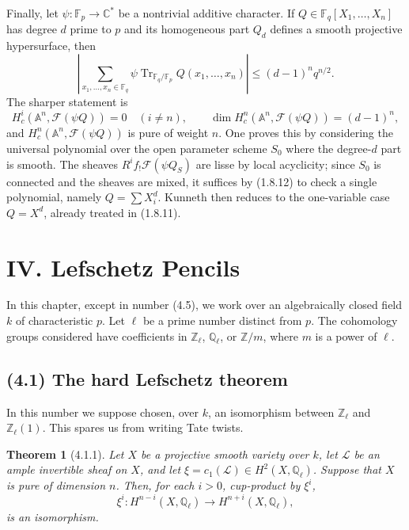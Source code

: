 \documentclass[11pt]{article}
\newtheorem{theorem}{Theorem}
\theoremstyle{remark}
\newcommand{\CC}{\mathbb{C}}
\newcommand{\Fq}{\mathbb{F}_q}
\newcommand{\Fp}{\mathbb{F}_p}
\begin{document}
Finally, let $\psi:\Fp\to\CC^*$ be a nontrivial additive character. If $Q\in\Fq[X_1,\ldots,X_n]$ has degree $d$ prime to $p$ and its homogeneous part $Q_d$ defines a smooth projective hypersurface, then
\begin{equation}\tag{3.7.2.1}
\left|\sum_{x_1,\ldots,x_n\in\Fq}\psi\operatorname{Tr}_{\Fq/\Fp} Q(x_1,\ldots,x_n)\right|
\le (d-1)^n q^{n/2}.
\end{equation}
The sharper statement is
\begin{equation}\tag{3.7.2.3}
H^i_c(\mathbb A^n,\mathcal F(\psi Q))=0\quad (i\ne n),\qquad
\dim H^n_c(\mathbb A^n,\mathcal F(\psi Q))=(d-1)^n,
\end{equation}
and $H^n_c(\mathbb A^n,\mathcal F(\psi Q))$ is pure of weight $n$. One proves this by considering the universal polynomial over the open parameter scheme $S_0$ where the degree-$d$ part is smooth. The sheaves $R^if_{!}\mathcal F(\psi Q_S)$ are lisse by local acyclicity; since $S_0$ is connected and the sheaves are mixed, it suffices by (1.8.12) to check a single polynomial, namely $Q=\sum X_i^d$. Kunneth then reduces to the one-variable case $Q=X^d$, already treated in (1.8.11).


\section*{IV. Lefschetz Pencils}

In this chapter, except in number (4.5), we work over an algebraically closed field $k$ of characteristic $p$. Let $\ell$ be a prime number distinct from $p$. The cohomology groups considered have coefficients in $\mathbb Z_\ell$, $\mathbb Q_\ell$, or $\mathbb Z/m$, where $m$ is a power of $\ell$.

\subsection*{(4.1) The hard Lefschetz theorem}

In this number we suppose chosen, over $k$, an isomorphism between $\mathbb Z_\ell$ and $\mathbb Z_\ell(1)$. This spares us from writing Tate twists.

\begin{theorem}[4.1.1]
Let $X$ be a projective smooth variety over $k$, let $\mathcal L$ be an ample invertible sheaf on $X$, and let $\xi=c_1(\mathcal L)\in H^2(X,\mathbb Q_\ell)$. Suppose that $X$ is pure of dimension $n$. Then, for each $i>0$, cup-product by $\xi^i$,
\[
 \xi^i:H^{n-i}(X,\mathbb Q_\ell)\longrightarrow H^{n+i}(X,\mathbb Q_\ell),
\]
is an isomorphism.
\end{theorem}
\end{document}
